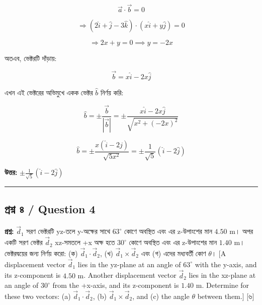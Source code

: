 \documentclass[11pt, a4paper]{article}
\begin{document}
$$\vec{a} \cdot \vec{b} = 0$$

$$\Rightarrow (2\hat{i} + \hat{j} - 3\hat{k}) \cdot (x\hat{i} + y\hat{j}) = 0$$

$$\Rightarrow 2x + y = 0 \implies y = -2x$$

অতএব, ভেক্টরটি দাঁড়ায়:

$$\vec{b} = x\hat{i} - 2x\hat{j}$$

এখন এই ভেক্টরের অভিমুখে একক ভেক্টর $\hat{b}$ নির্ণয় করি:

$$\hat{b} = \pm \frac{\vec{b}}{|\vec{b}|} = \pm \frac{x\hat{i} - 2x\hat{j}}{\sqrt{x^2 + (-2x)^2}}$$

$$\hat{b} = \pm \frac{x(\hat{i} - 2\hat{j})}{\sqrt{5x^2}} = \pm \frac{1}{\sqrt{5}}(\hat{i} - 2\hat{j})$$

\textbf{উত্তর:} $\pm \frac{1}{\sqrt{5}}(\hat{i} - 2\hat{j})$

\vspace{1em}
\begin{center}
\end{center}

\vspace{1em}
\noindent\rule{\textwidth}{0.4pt}
\vspace{1em}

\subsection*{প্রশ্ন ৪ / Question 4}
\textbf{প্রশ্ন:} $\vec{d}_1$ সরণ ভেক্টরটি yz-তলে y-অক্ষের সাথে $63^\circ$ কোণে অবস্থিত এবং এর z-উপাংশের মান $4.50\text{ m}$। অপর একটি সরণ ভেক্টর $\vec{d}_2$ xz-সমতলে +x অক্ষ হতে $30^\circ$ কোণে অবস্থিত এবং এর z-উপাংশের মান $1.40\text{ m}$। ভেক্টরদ্বয়ের জন্য নির্ণয় করো:
(ক) $\vec{d}_1 \cdot \vec{d}_2$, (খ) $\vec{d}_1 \times \vec{d}_2$ এবং (গ) এদের মধ্যবর্তী কোণ $\theta$। [A displacement vector $\vec{d}_1$ lies in the yz-plane at an angle of $63^\circ$ with the y-axis, and its z-component is $4.50\text{ m}$. Another displacement vector $\vec{d}_2$ lies in the xz-plane at an angle of $30^\circ$ from the +x-axis, and its z-component is $1.40\text{ m}$. Determine for these two vectors: (a) $\vec{d}_1 \cdot \vec{d}_2$, (b) $\vec{d}_1 \times \vec{d}_2$, and (c) the angle $\theta$ between them.] [৬]
\end{document}
